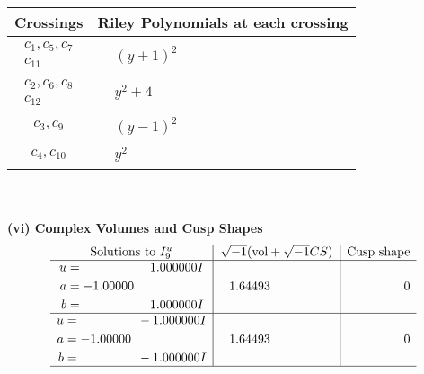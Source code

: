 \documentclass[1p]{elsarticle_modified}
\theoremstyle{definition}
\newcommand{\I}{\sqrt{-1}}
\begin{document}
\begin{tabular}{m{50pt}|m{274pt}}
Crossings & \hspace{64pt}Riley Polynomials at each crossing \\
\hline $$\begin{aligned}c_{1},c_{5},c_{7}\\c_{11}\end{aligned}$$&$\begin{aligned}
&(y+1)^2
\end{aligned}$\\
\hline $$\begin{aligned}c_{2},c_{6},c_{8}\\c_{12}\end{aligned}$$&$\begin{aligned}
&y^2+4
\end{aligned}$\\
\hline $$\begin{aligned}c_{3},c_{9}\end{aligned}$$&$\begin{aligned}
&(y-1)^2
\end{aligned}$\\
\hline $$\begin{aligned}c_{4},c_{10}\end{aligned}$$&$\begin{aligned}
&y^2
\end{aligned}$\\
\hline
\end{tabular}\\~\\
\newpage\flushleft \textbf{(vi) Complex Volumes and Cusp Shapes}
$$\begin{array}{c|c|c}  
\text{Solutions to }I^u_{9}& \I (\text{vol} + \sqrt{-1}CS) & \text{Cusp shape}\\
 \hline 
\begin{aligned}
u &= \phantom{-0.000000 -}1.000000 I \\
a &= -1.00000\phantom{ +0.000000I} \\
b &= \phantom{-0.000000 -}1.000000 I\end{aligned}
 & \phantom{-}1.64493\phantom{ +0.000000I} & \phantom{-0.000000 } 0 \\ \hline\begin{aligned}
u &= \phantom{-0.000000 } -1.000000 I \\
a &= -1.00000\phantom{ +0.000000I} \\
b &= \phantom{-0.000000 } -1.000000 I\end{aligned}
 & \phantom{-}1.64493\phantom{ +0.000000I} & \phantom{-0.000000 } 0\\
 \hline 
 \end{array}$$\newpage
\end{document}
